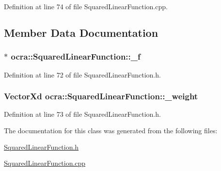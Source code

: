 Definition at line 74 of file Squared\+Linear\+Function.\+cpp.



\subsection{Member Data Documentation}
\subsubsection[{\texorpdfstring{\+\_\+f}{_f}}]{$\ast$ ocra\+::\+Squared\+Linear\+Function\+::\+\_\+f\hspace{0.3cm}{\ttfamily [protected]}}\hypertarget{classocra_1_1SquaredLinearFunction_a9848211537e6dc386ab237e6a1e233dc}{}\label{classocra_1_1SquaredLinearFunction_a9848211537e6dc386ab237e6a1e233dc}


Definition at line 72 of file Squared\+Linear\+Function.\+h.

\subsubsection[{\texorpdfstring{\+\_\+weight}{_weight}}]{\setlength{\rightskip}{0pt plus 5cm}Vector\+Xd ocra\+::\+Squared\+Linear\+Function\+::\+\_\+weight\hspace{0.3cm}{\ttfamily [protected]}}\hypertarget{classocra_1_1SquaredLinearFunction_ad21985a66257244ce79648a507ad5220}{}\label{classocra_1_1SquaredLinearFunction_ad21985a66257244ce79648a507ad5220}


Definition at line 73 of file Squared\+Linear\+Function.\+h.



The documentation for this class was generated from the following files\+:\begin{DoxyCompactItemize}
\item 
\hyperlink{SquaredLinearFunction_8h}{Squared\+Linear\+Function.\+h}\item 
\hyperlink{SquaredLinearFunction_8cpp}{Squared\+Linear\+Function.\+cpp}\end{DoxyCompactItemize}
